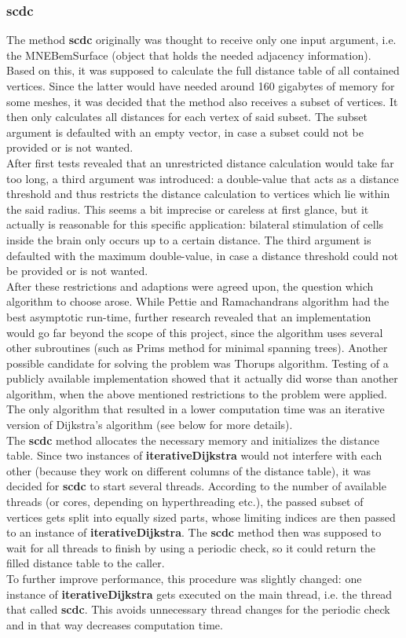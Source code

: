 \subsubsection{scdc}
The method \textbf{scdc} originally was thought to receive only one input argument, i.e. the MNEBemSurface (object that holds the needed adjacency information). Based on this, it was supposed to calculate the full distance table of all contained vertices. Since the latter would have needed around 160 gigabytes of memory for some meshes, it was decided that the method also receives a subset of vertices. It then only calculates all distances for each vertex of said subset. The subset argument is defaulted with an empty vector, in case a subset could not be provided or is not wanted.\\
After first tests revealed that an unrestricted distance calculation would take far too long, a third argument was introduced: a double-value that acts as a distance threshold and thus restricts the distance calculation to vertices which lie within the said radius. This seems a bit imprecise or careless at first glance, but it actually is reasonable for this specific application: bilateral stimulation of cells inside the brain only occurs up to a certain distance. The third argument is defaulted with the maximum double-value, in case a distance threshold could not be provided or is not wanted.\\
After these restrictions and adaptions were agreed upon, the question which algorithm to choose arose.
While Pettie and Ramachandrans algorithm had the best asymptotic run-time, further research revealed that an implementation would go far beyond the scope of this project, since the algorithm uses several other subroutines (such as Prims method for minimal spanning trees). Another possible candidate for solving the problem was Thorups algorithm. Testing of a publicly available implementation showed that it actually did worse than another algorithm, when the above mentioned restrictions to the problem were applied. The only algorithm that resulted in a lower computation time was an iterative version of Dijkstra's algorithm (see below for more details).\\
The \textbf{scdc} method allocates the necessary memory and initializes the distance table.
Since two instances of \textbf{iterativeDijkstra} would not interfere with each other (because they work on different columns of the distance table), it was decided for \textbf{scdc} to start several threads. According to the number of available threads (or cores, depending on hyperthreading etc.), the passed subset of vertices gets split into equally sized parts, whose limiting indices are then passed to an instance of \textbf{iterativeDijkstra}. The \textbf{scdc} method then was supposed to wait for all threads to finish by using a periodic check, so it could return the filled distance table to the caller.\\
To further improve performance, this procedure was slightly changed: one instance of \textbf{iterativeDijkstra} gets executed on the main thread, i.e. the thread that called \textbf{scdc}. This avoids unnecessary thread changes for the periodic check and in that way decreases computation time.

